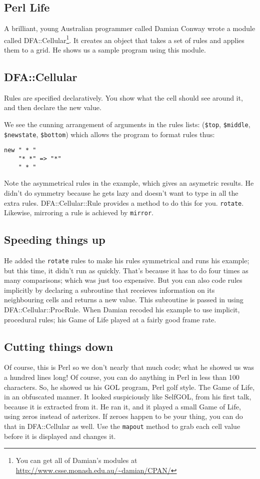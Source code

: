 \documentclass{article}
\begin{document}
\subsection{Perl Life}
A brilliant, young Australian programmer called Damian Conway wrote a 
module called DFA::Cellular\footnote{You can get all of Damian's modules
at \url{http://www.csse.monash.edu.au/~damian/CPAN/}}.  It creates an object that takes a
set of rules and applies them to a grid.  He shows us a sample program
using this module.

\subsection{DFA::Cellular}
Rules are specified declaratively.  You show what the cell should see
around it, and then declare the new value.

We see the cunning arrangement of arguments in the rules lists:
(\verb'$top', \verb'$middle', \verb'$newstate', \verb'$bottom')
which allows the program to format rules thus:

\begin{verbatim}
new " * "
    "* *" => "*"
    " * "
\end{verbatim}

Note the asymmetrical rules in the example, which gives an asymetric
results.  He didn't do symmetry because he gets lazy and doesn't want to
type in all the extra rules.
DFA::Cellular::Rule provides a method to do this for you.  \verb'rotate'.
Likewise, mirroring a rule is achieved by \verb'mirror'.

\subsection{Speeding things up}
He added the \verb'rotate' rules to make his rules symmetrical and runs
his example; but this time, it didn't run as quickly.  That's
because it has to do four times as many comparisons; which was just 
too expensive.  But you can also code rules
implicitly by declaring a subroutine that receieves information 
on its neighbouring cells and
returns a new value.  This subroutine is passed in using
DFA::Cellular::ProcRule.  When Damian recoded his example to use
implicit, procedural rules; his Game of Life played at a fairly good
frame rate.

\subsection{Cutting things down}
Of course, this is Perl so we don't nearly that much code; what he
showed us was a hundred lines long!  Of course, you can do
anything in Perl in less than 100 characters.  So, he showed us his
GOL program, Perl
golf style.  The Game of Life, in an obfuscated manner.  It
looked suspiciously like SelfGOL, from his first talk, because it
is extracted from it.  He ran it, and it played a small Game of Life,
using zeros instead of asterixes.  If zeroes happen to
be your thing, you can do that in DFA::Cellular as well.  Use the
\verb'mapout'
method to grab each cell value before it is displayed and changes it.
\end{document}
